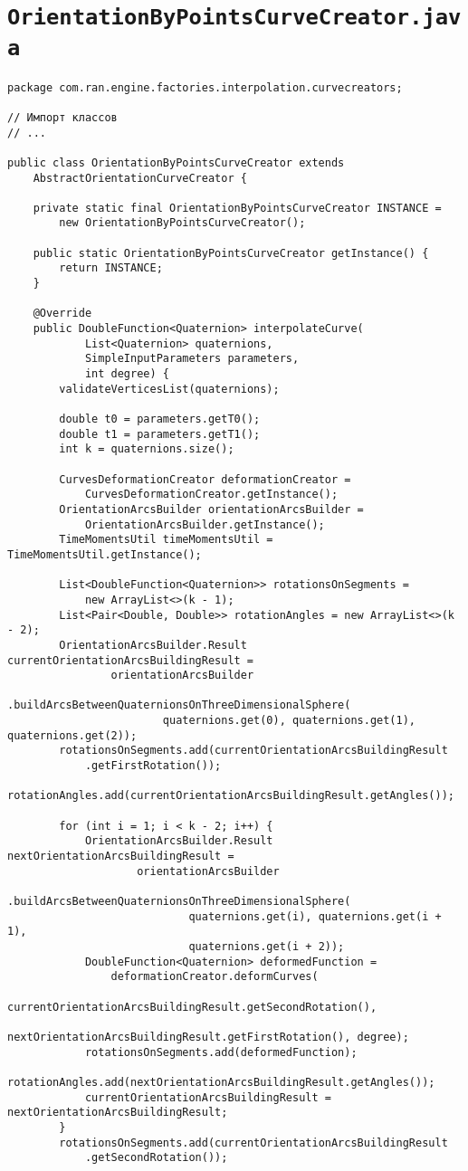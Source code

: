 \section*{\texttt{OrientationByPointsCurveCreator.java}}
\begin{verbatim}
package com.ran.engine.factories.interpolation.curvecreators;

// Импорт классов
// ...

public class OrientationByPointsCurveCreator extends
    AbstractOrientationCurveCreator {

    private static final OrientationByPointsCurveCreator INSTANCE =
        new OrientationByPointsCurveCreator();

    public static OrientationByPointsCurveCreator getInstance() {
        return INSTANCE;
    }

    @Override
    public DoubleFunction<Quaternion> interpolateCurve(
            List<Quaternion> quaternions,
            SimpleInputParameters parameters,
            int degree) {
        validateVerticesList(quaternions);

        double t0 = parameters.getT0();
        double t1 = parameters.getT1();
        int k = quaternions.size();

        CurvesDeformationCreator deformationCreator =
            CurvesDeformationCreator.getInstance();
        OrientationArcsBuilder orientationArcsBuilder =
            OrientationArcsBuilder.getInstance();
        TimeMomentsUtil timeMomentsUtil = TimeMomentsUtil.getInstance();

        List<DoubleFunction<Quaternion>> rotationsOnSegments =
            new ArrayList<>(k - 1);
        List<Pair<Double, Double>> rotationAngles = new ArrayList<>(k - 2);
        OrientationArcsBuilder.Result currentOrientationArcsBuildingResult =
                orientationArcsBuilder
                    .buildArcsBetweenQuaternionsOnThreeDimensionalSphere(
                        quaternions.get(0), quaternions.get(1), quaternions.get(2));
        rotationsOnSegments.add(currentOrientationArcsBuildingResult
            .getFirstRotation());
        rotationAngles.add(currentOrientationArcsBuildingResult.getAngles());

        for (int i = 1; i < k - 2; i++) {
            OrientationArcsBuilder.Result nextOrientationArcsBuildingResult =
                    orientationArcsBuilder
                        .buildArcsBetweenQuaternionsOnThreeDimensionalSphere(
                            quaternions.get(i), quaternions.get(i + 1),
                            quaternions.get(i + 2));
            DoubleFunction<Quaternion> deformedFunction =
                deformationCreator.deformCurves(
                    currentOrientationArcsBuildingResult.getSecondRotation(),
                    nextOrientationArcsBuildingResult.getFirstRotation(), degree);
            rotationsOnSegments.add(deformedFunction);
            rotationAngles.add(nextOrientationArcsBuildingResult.getAngles());
            currentOrientationArcsBuildingResult = nextOrientationArcsBuildingResult;
        }
        rotationsOnSegments.add(currentOrientationArcsBuildingResult
            .getSecondRotation());


\end{verbatim}
